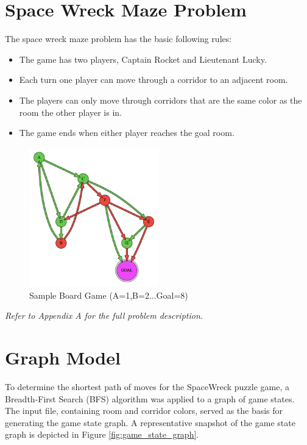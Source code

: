 \documentclass[12pt]{exam}
\begin{document}
\section*{Space Wreck Maze Problem}
The space wreck maze problem has the basic following rules:

\begin{itemize}
    \item The game has two players, Captain Rocket and Lieutenant Lucky.
    \item Each turn one player can move through a corridor to an adjacent room.
    \item The players can only move through corridors that are the same color as the room the other player is in.
    \item The game ends when either player reaches the goal room.
\end{itemize}


\begin{figure}[H]
    \centering
    \includegraphics[width=0.5\textwidth]{board_graph.png}
    \caption{Sample Board Game (A=1,B=2...Goal=8)}
    \label{fig:board_graph}
\end{figure}

\noindent \textit{Refer to Appendix A for the full problem description.}


\section*{Graph Model}

To determine the shortest path of moves for the SpaceWreck puzzle game, a Breadth-First Search (BFS) algorithm was applied to a graph of game states. The input file, containing room and corridor colors, served as the basis for generating the game state graph. A representative snapshot of the game state graph is depicted in Figure \ref{fig:game_state_graph}.
\end{document}
